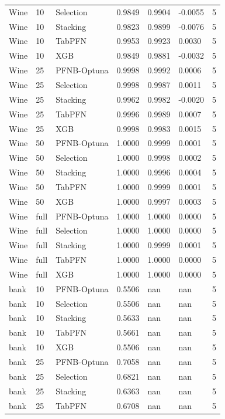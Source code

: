 \begin{tabular}{llllllr}
Wine & 10 & Selection & 0.9849 & 0.9904 & -0.0055 & 5 \\
Wine & 10 & Stacking & 0.9823 & 0.9899 & -0.0076 & 5 \\
Wine & 10 & TabPFN & 0.9953 & 0.9923 & 0.0030 & 5 \\
Wine & 10 & XGB & 0.9849 & 0.9881 & -0.0032 & 5 \\
Wine & 25 & PFNB-Optuna & 0.9998 & 0.9992 & 0.0006 & 5 \\
Wine & 25 & Selection & 0.9998 & 0.9987 & 0.0011 & 5 \\
Wine & 25 & Stacking & 0.9962 & 0.9982 & -0.0020 & 5 \\
Wine & 25 & TabPFN & 0.9996 & 0.9989 & 0.0007 & 5 \\
Wine & 25 & XGB & 0.9998 & 0.9983 & 0.0015 & 5 \\
Wine & 50 & PFNB-Optuna & 1.0000 & 0.9999 & 0.0001 & 5 \\
Wine & 50 & Selection & 1.0000 & 0.9998 & 0.0002 & 5 \\
Wine & 50 & Stacking & 1.0000 & 0.9996 & 0.0004 & 5 \\
Wine & 50 & TabPFN & 1.0000 & 0.9999 & 0.0001 & 5 \\
Wine & 50 & XGB & 1.0000 & 0.9997 & 0.0003 & 5 \\
Wine & full & PFNB-Optuna & 1.0000 & 1.0000 & 0.0000 & 5 \\
Wine & full & Selection & 1.0000 & 1.0000 & 0.0000 & 5 \\
Wine & full & Stacking & 1.0000 & 0.9999 & 0.0001 & 5 \\
Wine & full & TabPFN & 1.0000 & 1.0000 & 0.0000 & 5 \\
Wine & full & XGB & 1.0000 & 1.0000 & 0.0000 & 5 \\
bank & 10 & PFNB-Optuna & 0.5506 & nan & nan & 5 \\
bank & 10 & Selection & 0.5506 & nan & nan & 5 \\
bank & 10 & Stacking & 0.5633 & nan & nan & 5 \\
bank & 10 & TabPFN & 0.5661 & nan & nan & 5 \\
bank & 10 & XGB & 0.5506 & nan & nan & 5 \\
bank & 25 & PFNB-Optuna & 0.7058 & nan & nan & 5 \\
bank & 25 & Selection & 0.6821 & nan & nan & 5 \\
bank & 25 & Stacking & 0.6363 & nan & nan & 5 \\
bank & 25 & TabPFN & 0.6708 & nan & nan & 5 \\

\end{tabular}
